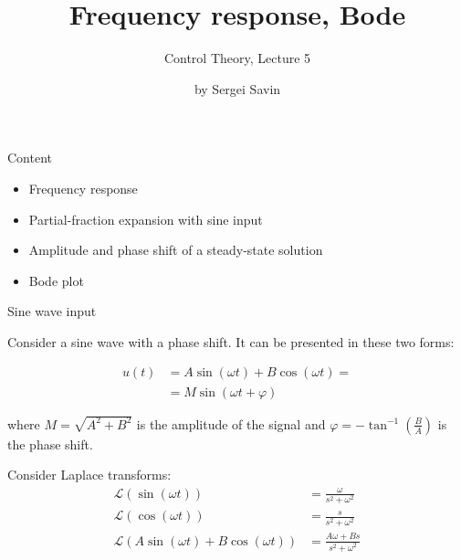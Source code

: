 \documentclass{beamer}
\title{Frequency response, Bode}
\subtitle{Control Theory, Lecture 5}
\author{by Sergei Savin}
\date{\mydate}
\begin{document}
\maketitle


\begin{frame}{Content}

\begin{itemize}
\item Frequency response
\item Partial-fraction expansion with sine input
\item Amplitude and phase shift of a steady-state solution
\item Bode plot
\end{itemize}

\end{frame}



\begin{frame}{Sine wave input}
	\begin{flushleft}
		
		Consider a sine wave with a phase shift. It can be presented in these two forms:
		
		\begin{align}
			u(t) &= A \sin (\omega t) + B \cos (\omega t) = \\
			&= M \sin  (\omega t + \varphi)
		\end{align}
		
		where $M = \sqrt{A^2 + B^2}$ is the amplitude of the signal and $ \varphi = - \tan^{-1} \left( \frac{B}{A} \right)$ is the phase shift.
		
		\bigskip
		
		Consider Laplace transforms:
		\begin{align}
			\mathcal{L} (\sin (\omega t)) &= \frac{\omega}{s^2 + \omega^2}
			\\
			\mathcal{L} (\cos (\omega t)) &= \frac{s}{s^2 + \omega^2}
			\\
			\mathcal{L} (A \sin (\omega t) + B \cos (\omega t) ) &= \frac{A \omega + B s}{s^2 + \omega^2}
		\end{align}		
		
		
		
		
	\end{flushleft}
\end{frame}
\end{document}
